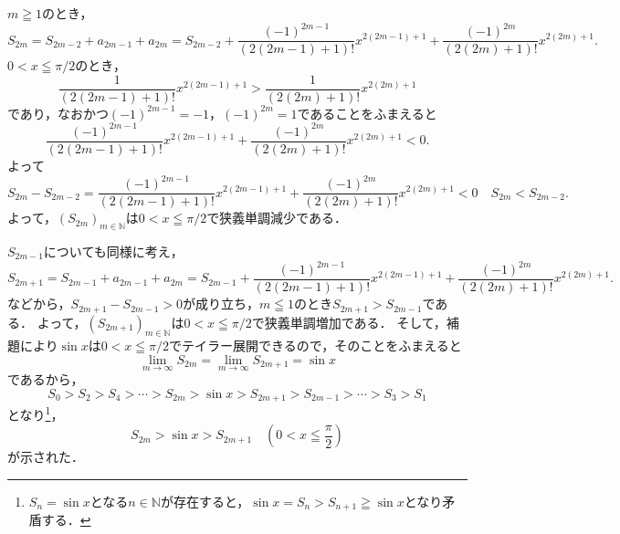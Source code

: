 \begin{tproof}
  $m \geqq 1$のとき，
  \[
    S_{2m} = S_{2m-2} +a_{2m-1} + a_{2m} = S_{2m-2} + \frac{(-1)^{2m-1}}{(2(2m-1)+1)!} x^{2(2m-1)+1} + \frac{(-1)^{2m}}{(2(2m)+1)!} x^{2(2m)+1}.
  \]
  $ 0< x \leqq \pi /2$のとき，
  \[
    \frac{1}{(2(2m-1)+1)!} x^{2(2m-1)+1} > \frac{1}{(2(2m)+1)!} x^{2(2m)+1}
  \]
  であり，なおかつ$(-1)^{2m-1} =-1$，$(-1)^{2m} =1$であることをふまえると
  \[
    \frac{(-1)^{2m-1}}{(2(2m-1)+1)!} x^{2(2m-1)+1} + \frac{(-1)^{2m}}{(2(2m)+1)!} x^{2(2m)+1} <0.
  \]
  よって
  \[
    S_{2m} -S_{2m-2}  = \frac{(-1)^{2m-1}}{(2(2m-1)+1)!} x^{2(2m-1)+1} + \frac{(-1)^{2m}}{(2(2m)+1)!} x^{2(2m)+1} <0 \quad S_{2m}<S_{2m-2}.
  \]
  よって，$(S_{2m})_{m \in \mathbb{N}}$は$0 < x \leqq \pi /2$で狭義単調減少である．

  $S_{2m-1}$についても同様に考え，
  \[
    S_{2m+1}=S_{2m-1} + a_{2m-1} +a_{2m}= S_{2m-1} + \frac{(-1)^{2m-1}}{(2(2m-1)+1)!} x^{2(2m-1)+1} + \frac{(-1)^{2m}}{(2(2m)+1)!} x^{2(2m)+1}.
  \]
  などから，$ S_{2m+1}-S_{2m-1} >0$が成り立ち，$m \leqq 1$のとき$S_{2m+1}>S_{2m-1}$である．
  よって，$(S_{2m+1})_{m \in \mathbb{N}}$は$0 < x \leqq \pi /2$で狭義単調増加である．
  そして，補題により$\sin x $は$0 < x \leqq \pi /2$でテイラー展開できるので，そのことをふまえると
  \[
    \lim_{m \to \infty} S_{2m} =\lim_{m \to \infty} S_{2m+1} =\sin x
  \]
  であるから，
  \[
    S_0 > S_2 > S_4 > \cdots > S_{2m} > \sin x > S_{2m+1} > S_{2m-1} > \cdots > S_3 > S_1
  \]
  となり\footnote{$S_n=\sin x$となる$n \in \mathbb{N}$が存在すると，$ \sin x=S_n  > S_{n+1}\geqq \sin x$となり矛盾する．}，
  \[
    S_{2m} > \sin x > S_{2m+1} \quad ( 0 < x \leqq \frac{\pi}{2} )
  \]
  が示された．
\end{tproof}





